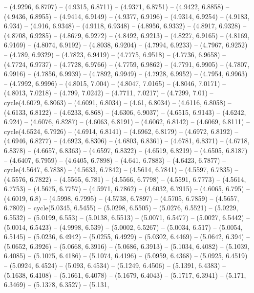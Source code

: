 {  -- (4.9296, 6.8707) -- (4.9315, 6.8711) -- (4.9371, 6.8751) -- (4.9422, 
  6.8858) -- (4.9436, 6.8955) -- (4.9414, 6.9149) -- (4.9377, 6.9196) -- 
  (4.9314, 6.9254) -- (4.9183, 6.934) -- (4.916, 6.9348) -- (4.9118, 6.9348) -- 
  (4.8956, 6.9332) -- (4.8917, 6.9328) -- (4.8708, 6.9285) -- (4.8679, 6.9272) 
  -- (4.8492, 6.9213) -- (4.8227, 6.9165) -- (4.8169, 6.9169) -- (4.8074, 
  6.9192) -- (4.8038, 6.9204) -- (4.7994, 6.9233) -- (4.7967, 6.9252) -- (4.789,
   6.9329) -- (4.7823, 6.9419) -- (4.7775, 6.9518) -- (4.7736, 6.9658) -- 
  (4.7724, 6.9737) -- (4.7728, 6.9766) -- (4.7759, 6.9862) -- (4.7791, 6.9905) 
  -- (4.7807, 6.9916) -- (4.7856, 6.9939) -- (4.7892, 6.9949) -- (4.7928, 
  6.9952) -- (4.7954, 6.9963) -- (4.7992, 6.9996) -- (4.8015, 7.004) -- (4.8047,
   7.0165) -- (4.8046, 7.0171) -- (4.8013, 7.0218) -- (4.799, 7.0242) -- 
  (4.7711, 7.0217) -- (4.7299, 7.01) -- cycle(4.6079, 6.8063) -- (4.6091, 
  6.8034) -- (4.61, 6.8034) -- (4.6116, 6.8058) -- (4.6133, 6.8122) -- (4.6233, 
  6.868) -- (4.6306, 6.9037) -- (4.6515, 6.9143) -- (4.6242, 6.924) -- (4.6076, 
  6.8287) -- (4.6063, 6.8191) -- (4.6062, 6.8142) -- (4.6069, 6.8111) -- 
  cycle(4.6524, 6.7926) -- (4.6914, 6.8141) -- (4.6962, 6.8179) -- (4.6972, 
  6.8192) -- (4.6946, 6.8277) -- (4.6923, 6.8306) -- (4.6803, 6.8361) -- 
  (4.6781, 6.8371) -- (4.6718, 6.8378) -- (4.6657, 6.8363) -- (4.6597, 6.8322) 
  -- (4.6519, 6.8219) -- (4.6505, 6.8187) -- (4.6407, 6.7959) -- (4.6405, 
  6.7898) -- (4.641, 6.7883) -- (4.6423, 6.7877) -- cycle(4.5647, 6.7838) -- 
  (4.5633, 6.7842) -- (4.5614, 6.7841) -- (4.5597, 6.7835) -- (4.5576, 6.7822) 
  -- (4.5565, 6.781) -- (4.5566, 6.7798) -- (4.5591, 6.7773) -- (4.5614, 6.7753)
   -- (4.5675, 6.7757) -- (4.5971, 6.7862) -- (4.6032, 6.7915) -- (4.6065, 
  6.795) -- (4.6019, 6.8) -- (4.5998, 6.7995) -- (4.5738, 6.7897) -- (4.5705, 
  6.7859) -- (4.5657, 6.7802) -- cycle(5.0345, 6.5455) -- (5.0298, 6.5505) -- 
  (5.0276, 6.5521) -- (5.0229, 6.5532) -- (5.0199, 6.553) -- (5.0138, 6.5513) --
   (5.0071, 6.5477) -- (5.0027, 6.5442) -- (5.0014, 6.5423) -- (4.9998, 6.539) 
  -- (5.0002, 6.5267) -- (5.0034, 6.517) -- (5.0054, 6.5145) -- (5.0236, 6.4942)
   -- (5.0255, 6.4929) -- (5.0302, 6.4469) -- (5.0642, 6.394) -- (5.0652, 
  6.3926) -- (5.0668, 6.3916) -- (5.0686, 6.3913) -- (5.1034, 6.4082) -- 
  (5.1039, 6.4085) -- (5.1075, 6.4186) -- (5.1074, 6.4196) -- (5.0959, 6.4368) 
  -- (5.0925, 6.4519) -- (5.0924, 6.4524) -- (5.093, 6.4534) -- (5.1249, 6.4506)
   -- (5.1391, 6.4383) -- (5.1638, 6.4108) -- (5.1661, 6.4078) -- (5.1679, 
  6.4043) -- (5.1717, 6.3941) -- (5.171, 6.3469) -- (5.1378, 6.3527) -- (5.131, 
}
